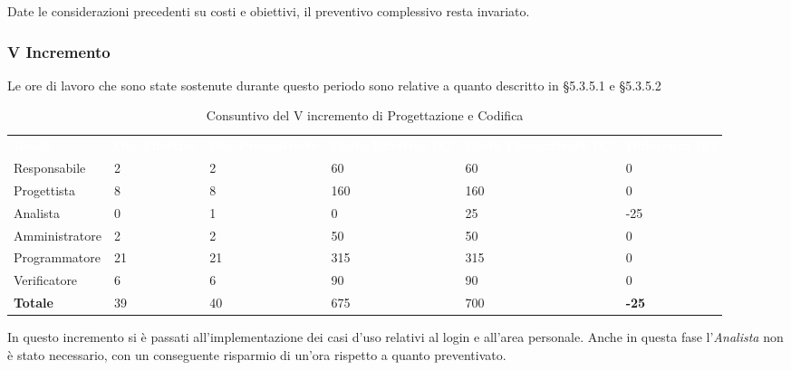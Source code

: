 Date le considerazioni precedenti su costi e obiettivi, il preventivo complessivo resta invariato.


\pagebreak


\subsubsection{V Incremento}
Le ore di lavoro che sono state sostenute durante questo periodo sono relative a quanto descritto in §5.3.5.1 e §5.3.5.2

\begin{table}[H]
\begin{center}
\renewcommand{\arraystretch}{1.5}
\begin{tabular}{ m{}<{\centering}  m{}<{\centering} m{}<{\centering} m{}<{\centering} m{}<{\centering} m{}<{\centering}}
	\rowcolor{darkblue}
	\textcolor{white}{\textbf{Ruolo}} & \textcolor{white}{\textbf{Ore Effettive}} & \textcolor{white}{\textbf{Ore Preventivate}}&\textcolor{white}{\textbf{Costo Effettivo (\euro)}}&\textcolor{white}{\textbf{Costo Preventivato (\euro)}}&\textcolor{white}{\textbf{Differenza (\euro)}}\\ 

	Responsabile  & 2 & 2 & 60 & 60 & 0\\	
	
	Progettista & 8 & 8 & 160 & 160 & 0\\
	
	Analista & 0 & 1 & 0 & 25 & -25\\
	
	Amministratore & 2 & 2 & 50 & 50 & 0\\
	
	Programmatore & 21 & 21 & 315 & 315 & 0\\
	
	Verificatore & 6 & 6 & 90 & 90 & 0\\
	
	\textbf{Totale} & 39 & 40 & 675 & 700 & \textbf{-25} \\
	
\end{tabular}
\caption{Consuntivo del V incremento di Progettazione e Codifica}
\end{center}
\end{table}

In questo incremento si è passati all'implementazione dei casi d'uso relativi al login e all'area personale. Anche in questa fase l'\textit{Analista} non è stato necessario, con un conseguente risparmio di un'ora rispetto a quanto preventivato. 


